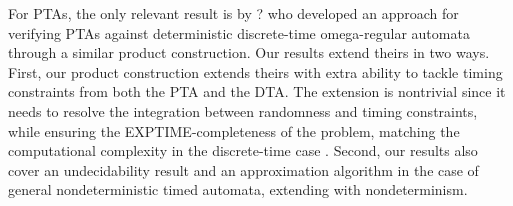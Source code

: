 For PTAs, the only relevant result is by ?\cite{?} who developed an approach for verifying PTAs against deterministic discrete-time omega-regular automata through a similar product construction.
Our results extend theirs in two ways.
First, our product construction extends theirs with extra ability to tackle timing constraints from both the PTA and the DTA.
The extension is nontrivial since it needs to resolve the integration between randomness and timing constraints, while ensuring the EXPTIME-completeness of the problem, matching the computational complexity in the discrete-time case \cite{?}.
Second, our results also cover an undecidability result and an approximation algorithm in the case of general nondeterministic timed automata, extending \cite{?} with nondeterminism.
